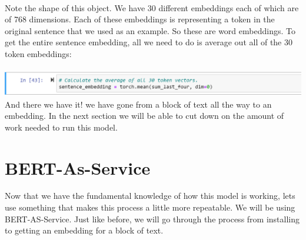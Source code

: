 \documentclass{article}
\begin{document}
\begin{enumerate}
    \vspace{.1cm}\\
    Note the shape of this object.  We have 30 different embeddings each of which are of 768 dimensions.  Each of these embeddings is representing a token in the original sentence that we used as an example.  So these are word embeddings. To get the entire sentence embedding, all we need to do is average out all of the 30 token embeddings:\\
    \vspace{.1cm}\\
    \includegraphics[scale = .8]{sentence_embed2.png}
    \vspace{.2cm}\\
    And there we have it! we have gone from a block of text all the way to an embedding.  In the next section we will be able to cut down on the amount of work needed to run this model.

\end{enumerate}

\section*{BERT-As-Service}

Now that we have the fundamental knowledge of how this model is working, lets use something that makes this process a little more repeatable. We will be using BERT-AS-Service.  Just like before, we will go through the process from installing to getting an embedding for a block of text.
\end{document}
